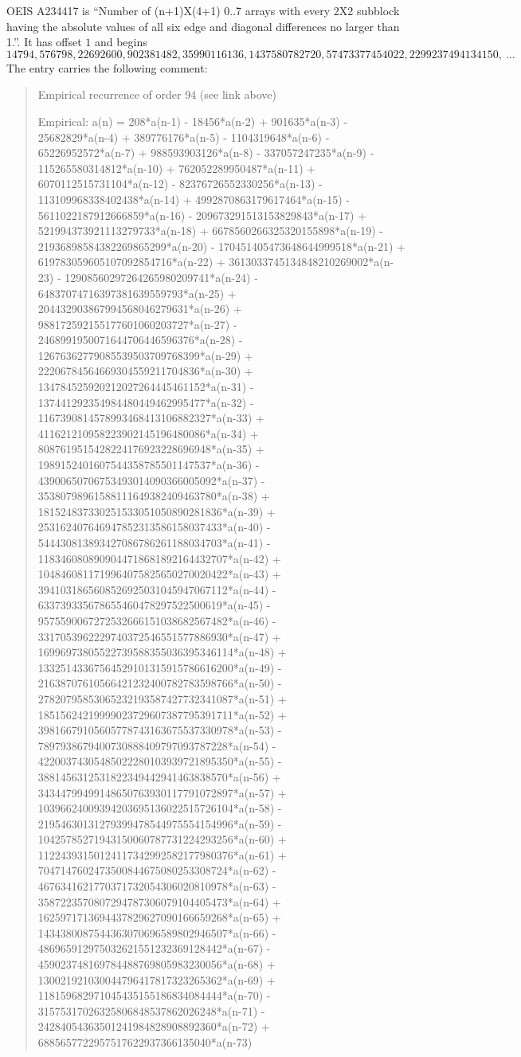 \documentclass[11pt,a4paper]{article}
\theoremstyle{plain}
\theoremstyle{definition}
\begin{document}
OEIS A234417 is ``Number of (n+1)X(4+1) 0..7 arrays with every 2X2 subblock having the absolute values of all six edge and diagonal differences no larger than 1.''. It has offset $1$ and begins
\[
14794, 576798, 22692600, 902381482, 35990116136, 1437580782720, 57473377454022, 2299237494134150,\ \dots
\]
The entry carries the following comment:
\begin{quote}\small
Empirical recurrence of order 94 (see link above)

Empirical: a(n) = 208*a(n-1) - 18456*a(n-2) + 901635*a(n-3) - 25682829*a(n-4) + 389776176*a(n-5) - 1104319648*a(n-6) - 65226952572*a(n-7) + 988593903126*a(n-8) - 337057247235*a(n-9) - 115265580314812*a(n-10) + 762052289950487*a(n-11) + 6070112515731104*a(n-12) - 82376726552330256*a(n-13) - 113109968338402438*a(n-14) + 4992870863179617464*a(n-15) - 5611022187912666859*a(n-16) - 209673291513153829843*a(n-17) + 521994373921113279733*a(n-18) + 6678560266325320155898*a(n-19) - 21936898584382269865299*a(n-20) - 170451405473648644999518*a(n-21) + 619783059605107092854716*a(n-22) + 3613033745134848210269002*a(n-23) - 12908560297264265980209741*a(n-24) - 64837074716397381639559793*a(n-25) + 204432903867994568046279631*a(n-26) + 988172592155177601060203727*a(n-27) - 2468991950071644706446596376*a(n-28) - 12676362779085539503709768399*a(n-29) + 22206784564669304559211704836*a(n-30) + 134784525920212027264445461152*a(n-31) - 137441292354984480449462995477*a(n-32) - 1167390814578993468413106882327*a(n-33) + 411621210958223902145196480086*a(n-34) + 8087619515428224176923228696948*a(n-35) + 1989152401607544358785501147537*a(n-36) - 43900650706753493014090366005092*a(n-37) - 35380798961588111649382409463780*a(n-38) + 181524837330251533051050890281836*a(n-39) + 253162407646947852313586158037433*a(n-40) - 544430813893427086786261188034703*a(n-41) - 1183460808909044718681892164432707*a(n-42) + 1048460811719964075825650270020422*a(n-43) + 3941031865608526925031045947067112*a(n-44) - 633739335678655460478297522500619*a(n-45) - 9575590067272532666151038682567482*a(n-46) - 3317053962229740372546551577886930*a(n-47) + 16996973805522739588355036395346114*a(n-48) + 13325143367564529101315915786616200*a(n-49) - 21638707610566421232400782783598766*a(n-50) - 27820795853065232193587427732341087*a(n-51) + 18515624219999023729607387795391711*a(n-52) + 39816679105605778743163675537330978*a(n-53) - 7897938679400730888409797093787228*a(n-54) - 42200374305485022280103939721895350*a(n-55) - 3881456312531822349442941463838570*a(n-56) + 34344799499148650763930117791072897*a(n-57) + 10396624009394203695136022515726104*a(n-58) - 21954630131279399478544975554154996*a(n-59) - 10425785271943150060787731224293256*a(n-60) + 11224393150124117342992582177980376*a(n-61) + 7047147602473500844675080253308724*a(n-62) - 4676341621770371732054306020810978*a(n-63) - 3587223570807294787306079104405473*a(n-64) + 1625971713694437829627090166659268*a(n-65) + 1434380087544363070696589802946507*a(n-66) - 486965912975032621551232369128442*a(n-67) - 459023748169784488769805983230056*a(n-68) + 130021921030044796417817323265362*a(n-69) + 118159682971045435155186834084444*a(n-70) - 31575317026325806848537862026248*a(n-71) - 24284054363501241984828908892360*a(n-72) + 6885657722957517622937366135040*a(n-73) 
\end{quote}
\end{document}
